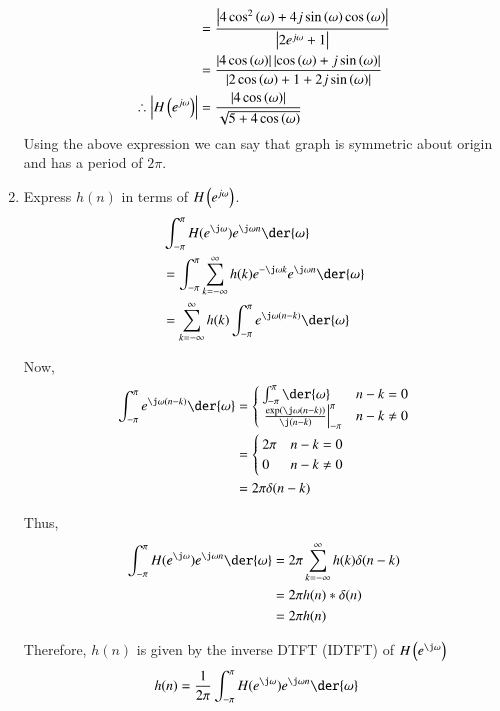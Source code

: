 \documentclass[journal,12pt,twocolumn]{IEEEtran}
\renewcommand\thesection{\arabic{section}}
\begin{document}
\begin{enumerate}[label=\thesection.\arabic*]
\begin{align}
                            &= \frac{\left\vert4\cos^2\left(\omega\right) + 4j\sin\left(\omega\right)\cos\left(\omega\right)\right\vert}{\left\vert2e^{j\omega} + 1\right\vert}\\
                            &= \frac{\left\vert4\cos\left(\omega\right)\right\vert\left\vert\cos\left(\omega\right) + j\sin\left(\omega\right)\right\vert}{\left\vert2\cos\left(\omega\right) + 1 + 2j\sin\left(\omega\right)\right\vert}\\
        \therefore \left\vert H\left(e^{j \omega}\right)\right\vert &= \frac{\left\vert4\cos\left(\omega\right)\right\vert}{\sqrt{5 +4\cos\left(\omega\right)}}
     \end{align}
      Using the above expression we can say that graph is symmetric about origin and has a period of $2\pi$.
  \item Express $h(n)$ in terms of $H\left(e^{j \omega}\right)$.\\

	\solution 
	\begin{align}
		&\int_{-\pi}^{\pi} H(e^{\j\omega}) e^{\j\omega n} \der{\omega} \\
		&= \int_{-\pi}^{\pi} \sum_{k=-\infty}^\infty h(k)  e^{-\j\omega k} e^{\j\omega n} \der{\omega} \\
		&= \sum_{k=-\infty}^\infty h(k) \int_{-\pi}^{\pi} e^{\j\omega(n-k)} \der{\omega}
	\end{align}
	
	Now,
	\begin{align}
		 \int_{-\pi}^{\pi} e^{\j\omega(n-k)} \der{\omega} 
		 &= \begin{cases}
		 	\int_{-\pi}^\pi \der{\omega} & n-k = 0 \\
		 	\left.\frac{\exp\brak{\j\omega(n-k)}}{\j(n-k)}\right|_{-\pi}^\pi & n-k \ne 0
		 \end{cases} \\		 
		 &= \begin{cases}
		 	2\pi & n-k = 0 \\
		 	0 & n-k \ne 0
		 \end{cases} \\
		 &= 2\pi \delta(n-k)
	\end{align}
	
	Thus,
	\begin{align}
		\int_{-\pi}^{\pi} H(e^{\j\omega}) e^{\j\omega n} \der{\omega} &= 2\pi\sum_{k=-\infty}^\infty h(k) \delta(n-k) \\
		&= 2\pi h(n) * \delta(n) \\
		&= 2\pi h(n)
	\end{align}
	
	Therefore, $h(n)$ is given by the inverse DTFT (IDTFT) of $H\brak{e^{\j\omega}}$
	\begin{align}
		h(n) &= \frac{1}{2\pi} \int_{-\pi}^{\pi} H(e^{\j\omega}) e^{\j\omega n} \der{\omega} 
	\end{align}
\end{enumerate}
\end{document}
